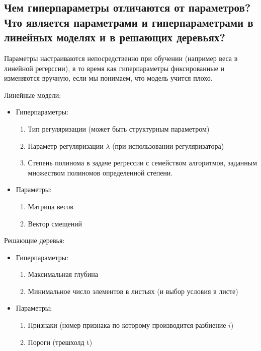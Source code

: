 \subsection{Чем гиперпараметры отличаются от параметров? Что является параметрами и гиперпараметрами в линейных моделях и в решающих деревьях?}

Параметры настраиваются непосредственно при обучении (например веса в линейной регерссии), в то время как гиперпараметры фиксированные и изменяются вручную, если мы понимаем, что модель учится плохо.

Линейные модели:

\begin{itemize}
    \item Гиперпараметры:
    \begin{enumerate}
        \item Тип регуляризации (может быть структурным параметром)
        \item Параметр регуляризации $\lambda$ (при использовании регуляризатора)
        \item Степень полинома в задаче регрессии с семейством алгоритмов, заданным множеством полиномов определенной степени.
    \end{enumerate}
    
    \item Параметры:
    
    \begin{enumerate}
        \item Матрица весов
        \item Вектор смещений
    \end{enumerate}
\end{itemize}

Решающие деревья:

\begin{itemize}
    \item Гиперпараметры:
    \begin{enumerate}
        \item Максимальная глубина
        \item Минимальное число элементов в листьях (и выбор условия в листе)
    \end{enumerate}
    
    \item Параметры:
    
    \begin{enumerate}
        \item Признаки (номер признака по которому производится разбиение $i$)
        \item Пороги (трешхолд t)
    \end{enumerate}
\end{itemize}











